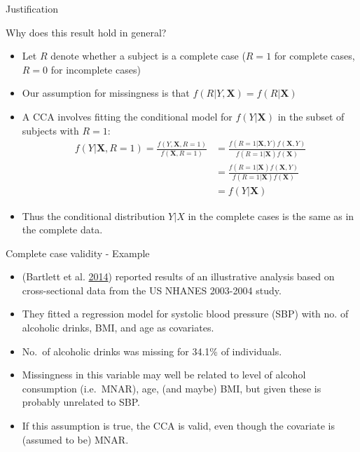 \documentclass[ignorenonframetext,]{beamer}
\providecommand{\tightlist}{%
  \setlength{\itemsep}{0pt}\setlength{\parskip}{0pt}}
\begin{document}
\begin{frame}{Justification}
\protect\hypertarget{justification}{}

Why does this result hold in general?

\begin{itemize}
\tightlist
\item
  Let \(R\) denote whether a subject is a complete case (\(R=1\) for
  complete cases, \(R=0\) for incomplete cases)
\item
  Our assumption for missingness is that
  \(f(R|Y,\mathbf X)=f(R|\mathbf X)\)
\item
  A CCA involves fitting the conditional model for \(f(Y|\mathbf X)\) in
  the subset of subjects with \(R=1\): \[
  \begin{aligned}
  f(Y|\mathbf X,R=1) = \frac{f(Y,\mathbf X,R=1)}{f(\mathbf X,R=1)} &= \frac{f(R=1|\mathbf X,Y)f(\mathbf X,Y)}{f(R=1|\mathbf X)f(\mathbf X)} \\
    &= \frac{f(R=1|\mathbf X) f(\mathbf X,Y)}{f(R=1|\mathbf X) f(\mathbf X)} \\
    &= f(Y|\mathbf X)
  \end{aligned}
  \]
\item
  Thus the conditional distribution \(Y|X\) in the complete cases is the
  same as in the complete data.
\end{itemize}

\end{frame}

\begin{frame}{Complete case validity - Example}
\protect\hypertarget{complete-case-validity---example}{}

\begin{itemize}
\tightlist
\item
  (Bartlett et al. \protect\hyperlink{ref-Bartlett2014a}{2014}) reported
  results of an illustrative analysis based on cross-sectional data from
  the US NHANES 2003-2004 study.
\item
  They fitted a regression model for systolic blood pressure (SBP) with
  no. of alcoholic drinks, BMI, and age as covariates.
\item
  No.~of alcoholic drinks was missing for 34.1\% of individuals.
\item
  Missingness in this variable may well be related to level of alcohol
  consumption (i.e.~MNAR), age, (and maybe) BMI, but given these is
  probably unrelated to SBP.
\item
  If this assumption is true, the CCA is valid, even though the
  covariate is (assumed to be) MNAR.
\end{itemize}

\end{frame}
\end{document}
